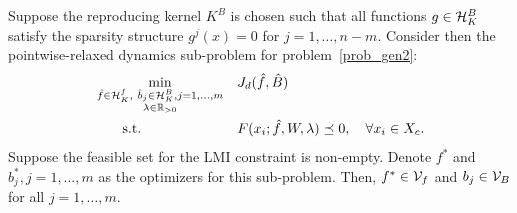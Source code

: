 \begin{theorem}\label{thm:rep_dyn}
Suppose the reproducing kernel $K^B$ is chosen such that all functions $g \in \mathcal{H}_K^B$ satisfy the sparsity structure $g^j(x) = 0$ for $j = 1,\ldots,n-m$. Consider then the pointwise-relaxed dynamics sub-problem for problem~\eqref{prob_gen2}:
\begin{align}
&\min_{\substack{\hat{f} \in \mathcal{H}_{K}^{f}, \ \hat{b}_j \in \mathcal{H}_{K}^{B}, j =1,\ldots,m \\ \lambda \in \mathbb{R}_{>0}}} && J_d(\hat{f},\hat{B})  \nonumber \\
&\qquad \text{s.t.} && F(x_i; \hat{f},W,\lambda) \preceq 0, \quad \forall x_i \in X_c. \label{lmi_pw1}
\end{align}
Suppose the feasible set for the LMI constraint is non-empty. Denote $f^*$ and $b_j^*, j = 1,\ldots, m$ as the optimizers for this sub-problem. Then, $f^* \in \mathcal{V}_{f}$ and $b_j \in \mathcal{V}_{B}$ for all $j = 1,\ldots, m$. 
\end{theorem}
